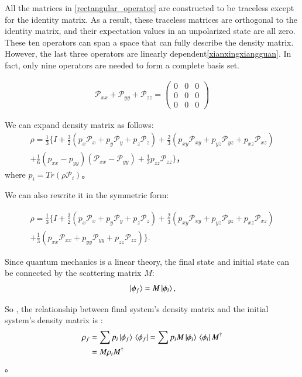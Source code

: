 \documentclass[twocolumn,twoside,showpacs,preprintnumbers,superscriptaddress,amsmath,amssymb,prc]{revtex4}
\begin{document}
 All the matrices in \ref{rectangular_operator} are constructed to be traceless except for the identity matrix. As a result, these traceless matrices are orthogonal to the identity matrix, and their expectation values in an unpolarized state are all zero. These ten operators can span a space that can fully describe the density matrix. However, the last three operators are linearly dependent\ref{xianxingxiangguan}. In fact, only nine operators are needed to form a complete basis set.

\begin{align}
    \mathscr{P}_{x x}+\mathscr{P}_{y y}+\mathscr{P}_{z z}=\left(\begin{array}{lll}
0 & 0 & 0 \\
0 & 0 & 0 \\
0 & 0 & 0
\end{array}\right)
\label{xianxingxiangguan}
\end{align}

We can expand density matrix as follows:
\begin{align}
  \rho = \frac{1}{3} \{
  I + \frac{3}{2} \left( p_x \mathscr{P}_x + p_y \mathscr{P}_y + p_z \mathscr{P}_z \right) + 
   \frac{2}{3} 
  \left( 
  p_{xy} 
  \mathscr{P}_{xy} + 
  p_{yz} \mathscr{P}_{yz} + p_{xz} \mathscr{P}_{xz} 
  \right) 
 \\ \nonumber
  + 
  \frac{1}{6} (p_{xx} - p_{yy})(\mathscr{P}_{xx} - \mathscr{P}_{yy}) +\frac{1}{2} p_{zz} \mathscr{P}_{zz} 
  \}，
\end{align}
where $p_i = Tr(\rho \mathscr{P}_i)$。

We can also rewrite it in the symmetric form:

\begin{align}
  \rho = \frac{1}{3} \{
  I + \frac{3}{2} \left( p_x \mathscr{P}_x + p_y \mathscr{P}_y + p_z \mathscr{P}_z \right) + 
   \frac{2}{3} 
  \left( 
  p_{xy} 
  \mathscr{P}_{xy} + 
  p_{yz} \mathscr{P}_{yz} + p_{xz} \mathscr{P}_{xz} 
  \right) 
 \\ \nonumber
  + 
  \frac{1}{3} ( p_{xx} \mathscr{P}_{xx} + p_{yy} \mathscr{P}_{yy} +p_{zz} \mathscr{P}_{zz} )
  \}.
\end{align}


Since quantum mechanics is a linear theory, the final state and initial state can be connected by the scattering matrix $M$:
    \begin{align}
        \ket*{\phi_f}  = M \ket*{\phi_i},
    \end{align}

So , the relationship between final system's density matrix and the initial system's density matrix is :
    \begin{align}
        \rho_f &= \sum p_i \ket*{\phi_f} \bra*{\phi_f} = \sum p_i M \ket*{\phi_i} \bra*{\phi_i} M^\dagger \\
        &=M\rho_i M^\dagger
    \end{align}。
\end{document}
